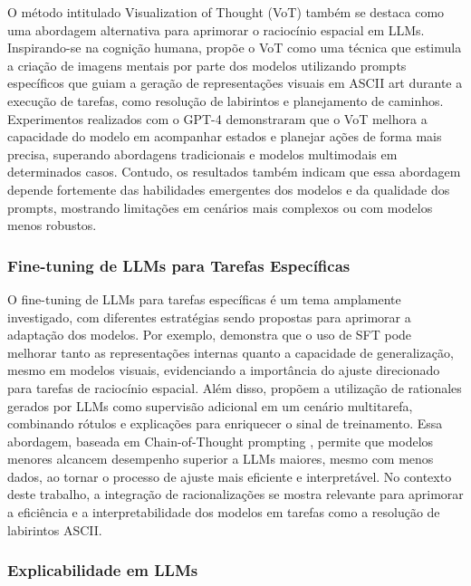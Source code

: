 O método intitulado Visualization of Thought (VoT) também se destaca como uma abordagem alternativa para aprimorar o raciocínio espacial em LLMs. Inspirando-se na cognição humana, \cite{wu2024mind} propõe o VoT como uma técnica que estimula a criação de imagens mentais por parte dos modelos utilizando prompts específicos que guiam a geração de representações visuais em ASCII art durante a execução de tarefas, como resolução de labirintos e planejamento de caminhos. Experimentos realizados com o GPT-4 demonstraram que o VoT melhora a capacidade do modelo em acompanhar estados e planejar ações de forma mais precisa, superando abordagens tradicionais e modelos multimodais em determinados casos. Contudo, os resultados também indicam que essa abordagem depende fortemente das habilidades emergentes dos modelos e da qualidade dos prompts, mostrando limitações em cenários mais complexos ou com modelos menos robustos.

\subsubsection{Fine-tuning de LLMs para Tarefas Específicas}

O fine-tuning de LLMs para tarefas específicas é um tema amplamente investigado, com diferentes estratégias sendo propostas para aprimorar a adaptação dos modelos. Por exemplo, \cite{wang2024picture} demonstra que o uso de SFT pode melhorar tanto as representações internas quanto a capacidade de generalização, mesmo em modelos visuais, evidenciando a importância do ajuste direcionado para tarefas de raciocínio espacial. Além disso, \cite{hsieh2023distillingstepbystep} propõem a utilização de rationales gerados por LLMs como supervisão adicional em um cenário multitarefa, combinando rótulos e explicações para enriquecer o sinal de treinamento. Essa abordagem, baseada em Chain-of-Thought prompting \cite{wei2023chainofthought}, permite que modelos menores alcancem desempenho superior a LLMs maiores, mesmo com menos dados, ao tornar o processo de ajuste mais eficiente e interpretável. No contexto deste trabalho, a integração de racionalizações se mostra relevante para aprimorar a eficiência e a interpretabilidade dos modelos em tarefas como a resolução de labirintos ASCII.

\subsubsection{Explicabilidade em LLMs}


